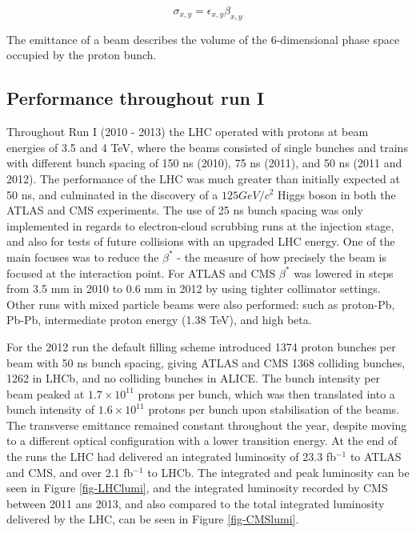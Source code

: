 \begin{equation} \label{eqn-beamsize}
\sigma_{x,y}=\epsilon_{x,y}\beta_{x,y}
\end{equation}

The emittance of a beam describes the volume of the 6-dimensional phase space occupied by the proton bunch.

\subsection{Performance throughout run I}

Throughout Run I (2010 - 2013) the LHC operated with protons at beam energies of 3.5 and 4 TeV, where the beams consisted of single bunches and trains with different bunch spacing of 150 ns (2010), 75 ns (2011), and 50 ns (2011 and 2012). The performance of the LHC was much greater than initially expected at 50 ns, and culminated in the discovery of a $125 GeV/c^2$ Higgs boson in both the ATLAS \cite{ATLASHiggs} and CMS \cite{CMSHiggs} experiments. The use of 25 ns bunch spacing was only implemented in regards to electron-cloud scrubbing runs at the injection stage, and also for tests of future collisions with an upgraded LHC energy. One of the main focuses was to reduce the $\beta^*$ - the measure of how precisely the beam is focused at the interaction point. For ATLAS and CMS $\beta^*$ was lowered in steps from 3.5 mm in 2010 to 0.6 mm in 2012 by using tighter collimator settings. Other runs with mixed particle beams were also performed: such as proton-Pb, Pb-Pb, intermediate proton energy (1.38 TeV), and high beta.

For the 2012 run the default filling scheme introduced 1374 proton bunches per beam with 50 ns bunch spacing, giving ATLAS and CMS 1368 colliding bunches, 1262 in LHCb, and no colliding bunches in ALICE. The bunch intensity per beam peaked at $1.7 \times 10^{11}$ protons per bunch, which was then translated into a bunch intensity of $1.6 \times 10^{11}$ protons per bunch upon stabilisation of the beams. The transverse emittance remained constant throughout the year, despite moving to a different optical configuration with a lower transition energy. At the end of the runs the LHC had delivered an integrated luminosity of 23.3 fb$^{-1}$ to ATLAS and CMS, and over 2.1 fb$^{-1}$ to LHCb. The integrated and peak luminosity can be seen in Figure \ref{fig-LHClumi}, and the integrated luminosity recorded by CMS between 2011 ans 2013, and also compared to the total integrated luminosity delivered by the LHC, can be seen in Figure \ref{fig-CMSlumi}.

